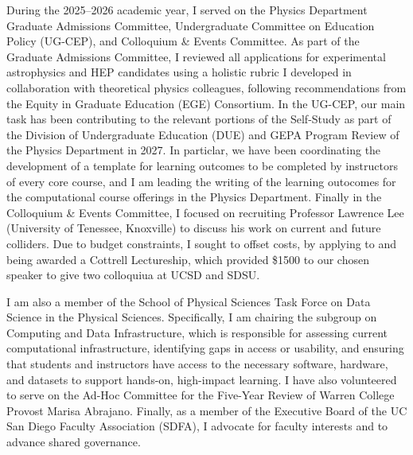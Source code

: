 \documentclass[11pt,letterpaper,notitlepage]{article}
\begin{document}
During the 2025--2026 academic year, I served on the Physics Department Graduate Admissions Committee, Undergraduate Committee on Education Policy (UG-CEP), and Colloquium \& Events Committee.
As part of the Graduate Admissions Committee, I reviewed all applications for experimental astrophysics and HEP candidates using a holistic rubric I developed in collaboration with theoretical physics colleagues, following recommendations from the Equity in Graduate Education (EGE) Consortium.
In the UG-CEP, our main task has been contributing to the relevant portions of the Self-Study as part of the Division of Undergraduate Education (DUE) and GEPA Program Review of the Physics Department in 2027.
In particlar, we have been coordinating the development of a template for learning outcomes to be completed by instructors of every core course, and I am leading the writing of the learning outocomes for the computational course offerings in the Physics Department.
Finally in the Colloquium \& Events Committee, I focused on recruiting Professor Lawrence Lee (University of Tenessee, Knoxville) to discuss his work on current and future colliders.
Due to budget constraints, I sought to offset costs, by applying to and being awarded a Cottrell Lectureship, which provided \$1500 to our chosen speaker to give two colloquiua at UCSD and SDSU.

I am also a member of the School of Physical Sciences Task Force on Data Science in the Physical Sciences.
Specifically, I am chairing the subgroup on Computing and Data Infrastructure, which is responsible for assessing current computational infrastructure, identifying gaps in access or usability, and ensuring that students and instructors have access to the necessary software, hardware, and datasets to support hands-on, high-impact learning.
I have also volunteered to serve on the Ad-Hoc Committee for the Five-Year Review of Warren College Provost Marisa Abrajano.
Finally, as a member of the Executive Board of the UC San Diego Faculty Association (SDFA), I advocate for faculty interests and to advance shared governance.
\end{document}
